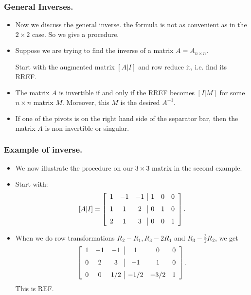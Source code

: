 
\begin{frame}%
 \frametitle{General Inverses.}
  \begin{itemize}%
 
\item  Now we discuss the general inverse. the formula is not as
convenient as in the $2\times 2$ case. So we give a procedure.

\item Suppose we are trying to find the inverse of a matrix
$A=A_{n\times n}$.

Start with the augmented matrix $\left[A|I\right]$ and row reduce it, i.e. find its
RREF.

\item The matrix $A$ is invertible if and only if the RREF becomes $\left[I|M\right]$
for some $n\times n$ matrix $M$. Moreover, this $M$ is the desired
$A^{-1}$.

\item If one of the pivots is on the right hand side of the separator
bar, then the matrix $A$ is non invertible or singular.
\end{itemize}
 
\end{frame}


\begin{frame}%
  \frametitle{Example of inverse.}
  \begin{itemize}%
\item
We now illustrate the procedure on our $3\times 3$ matrix in the second
example.

\item Start with:
$$\left[A|I\right] =
\left[ \begin {array}{ccc|ccc} 1&-1&-1&1&0&0\\\noalign{\medskip}
1&1&2&0&1&0\\\noalign{\medskip}
2&1&3&0&0&1\end {array} \right]
.$$

\item When we do row transformations $R_2-R_1, R_3-2R_1$ and
$R_3-\frac{3}{2}R_2$, we get
$$\left[ \begin {array}{ccc|ccc}
1&-1&-1&1&0&0\\\noalign{\medskip}
0&2&3&-1&1&0\\\noalign{\medskip}
0&0&1/2&-1/2&-3/2&1\end {array}
\right].$$
This is REF.
\end{itemize}
\end{frame}

